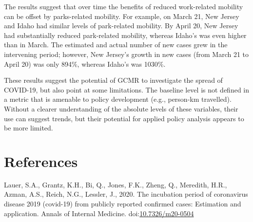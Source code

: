 \documentclass[]{elsarticle} %
\begin{document}
The results suggest that over time the benefits of reduced work-related
mobility can be offset by parks-related mobility. For example, on March
21, New Jersey and Idaho had similar levels of park-related mobility. By
April 20, New Jersey had substantially reduced park-related mobility,
whereas Idaho's was even higher than in March. The estimated and actual
number of new cases grew in the intervening period; however, New
Jersey's growth in new cases (from March 21 to April 20) was only 894\%,
whereas Idaho's was 1030\%.

These results suggest the potential of GCMR to investigate the spread of
COVID-19, but also point at some limitations. The baseline level is not
defined in a metric that is amenable to policy development (e.g.,
person-km travelled). Without a clearer understanding of the absolute
levels of these variables, their use can suggest trends, but their
potential for applied policy analysis appears to be more limited.

\hypertarget{references}{%
\section*{References}\label{references}}

\hypertarget{refs}{}
\leavevmode\hypertarget{ref-Lauer2020incubation}{}%
Lauer, S.A., Grantz, K.H., Bi, Q., Jones, F.K., Zheng, Q., Meredith,
H.R., Azman, A.S., Reich, N.G., Lessler, J., 2020. The incubation period
of coronavirus disease 2019 (covid-19) from publicly reported confirmed
cases: Estimation and application. Annals of Internal Medicine.
doi:\href{https://doi.org/10.7326/m20-0504}{10.7326/m20-0504}
\end{document}
